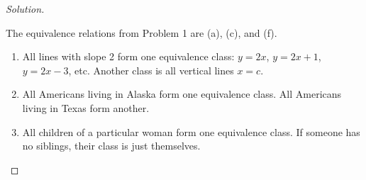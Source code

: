 \documentclass[12pt]{article}
\begin{document}
\begin{proof}[Solution]
~

The equivalence relations from Problem 1 are (a), (c), and (f).

\begin{enumerate}[label=(\alph*)]
    \item All lines with slope 2 form one equivalence class: $y = 2x$, $y = 2x+1$, $y = 2x - 3$, etc. Another class is all vertical lines $x = c$.

    \setcounter{enumi}{2}
    \item All Americans living in Alaska form one equivalence class. All Americans living in Texas form another.

    \setcounter{enumi}{5}
    \item All children of a particular woman form one equivalence class. If someone has no siblings, their class is just themselves.
\end{enumerate}
\end{proof}
\end{document}
